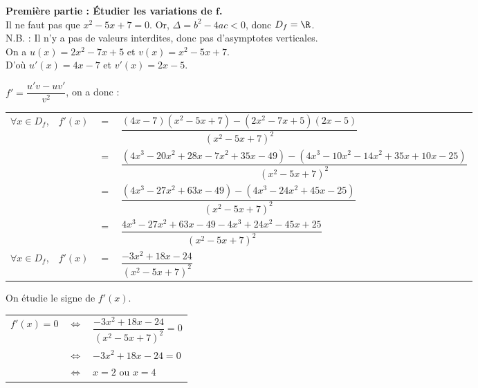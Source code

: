 \textbf{Première partie : Étudier les variations de $\mathbf{f}$.} \\

Il ne faut pas que $x^2 - 5x + 7 = 0$. Or, $\Delta = b^2 - 4ac < 0$, donc $D_f = \R$. \\

N.B. : Il n'y a pas de valeurs interdites, donc pas d'asymptotes verticales. \\

On a $u(x) = 2x^2 - 7x +5$ et $v(x) = x^2 - 5x + 7$. \\
D'où $u'(x) = 4x - 7$ et $v'(x) = 2x - 5$. \\

\vspace*{.3cm}

$f' = \dfrac{u'v - uv'}{v^2}$, on a donc :

\begin{tabular}{llll}
$\forall x \in D_f$, & $f'(x)$ & $=$ & $\dfrac{\left(4x-7\right)\left(x^2 - 5x + 7\right)-\left(2x^2 - 7x + 5\right)\left(2x-5\right)}{\left(x^2 - 5x + 7\right)^2}$ \vspace*{.3cm} \\
& & $=$ & $\dfrac{\left(4x^3 - 20x^2 + 28x - 7x^2 + 35x - 49\right)-\left(4x^3 - 10x^2 - 14x^2 + 35x + 10x - 25\right)}{\left(x^2 - 5x + 7\right)^2}$ \vspace*{.3cm} \\
& & $=$ & $\dfrac{\left(4x^3 - 27x^2 +63x - 49\right)-\left(4x^3 - 24x^2 +45x - 25\right)}{\left(x^2 - 5x + 7\right)^2}$ \vspace*{.3cm} \\
& & $=$ & $\dfrac{4x^3 - 27x^2 +63x - 49 - 4x^3 + 24x^2 -45x + 25}{\left(x^2 - 5x + 7\right)^2}$ \vspace*{.3cm} \\
$\forall x \in D_f$, & $f'(x)$ & $=$ & $\dfrac{-3x^2 + 18x - 24}{\left(x^2 - 5x + 7\right)^2}$ \vspace*{.3cm} \\
\end{tabular}

On étudie le signe de $f'(x)$. \\

\begin{tabular}{lll}
$f'(x) = 0$ & $\Longleftrightarrow$ & $\dfrac{-3x^2 + 18x - 24}{\left(x^2 - 5x + 7\right)^2} = 0$ \vspace*{.3cm} \\
& $\Longleftrightarrow$ & $-3x^2 + 18x - 24 = 0$ \vspace*{.3cm} \\
& $\Longleftrightarrow$ & $x= 2$ ou $x = 4$ \vspace*{.3cm}\\
\end{tabular}


